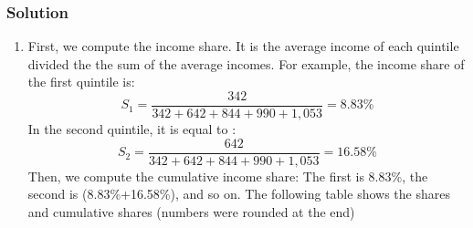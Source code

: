 \documentclass[letterpaper]{article}\usepackage[]{graphicx}\usepackage[]{color}
\numberwithin{exer}{section}
\theoremstyle{nonumberplain}
\begin{document}
\subsubsection*{Solution}
\begin{enumerate}
\item First, we compute the income share. It is the average income of
  each quintile divided the the sum of the average incomes. For example, the income share of the first quintile is:
\[
S_1 = \frac{342}{
  342+642+844+990+1,053}=
8.83\%
\]
In the second quintile, it is equal to :
\[
S_2 = \frac{642}{
  342+642+844+990+1,053}=
16.58\%
\]
Then, we compute the cumulative income share: The first is
8.83\%, the second is
(8.83\%+16.58\%),
and so on. The following table shows the shares and cumulative shares
(numbers were rounded at the end)
\begin{center}  
\end{center}
\end{enumerate}
\end{document}

